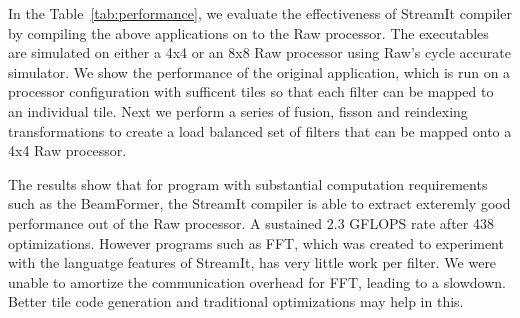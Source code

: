 In the Table~\ref{tab:performance}, we evaluate the effectiveness of
StreamIt compiler by compiling the above applications on to the Raw
processor. The executables are simulated on either a 4x4 or an 8x8 Raw
processor using Raw's cycle accurate simulator. We show the
performance of the original application, which is run on a processor
configuration with sufficent tiles so that each filter can be mapped
to an individual tile. Next we perform a series of fusion, fisson and
reindexing transformations to create a load balanced set of filters
that can be mapped onto a 4x4 Raw processor.

The results show that for program with substantial computation
requirements such as the BeamFormer, the StreamIt compiler is able to
extract exteremly good performance out of the Raw processor. A
sustained 2.3 GFLOPS rate after 438%
optimizations. However programs such as FFT, which was created to
experiment with the languatge features of StreamIt, has very little
work per filter. We were unable to amortize the communication
overhead for FFT, leading to a slowdown. Better tile code generation
and traditional optimizations may help in this. 

